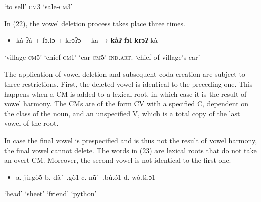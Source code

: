\begin{styleindexi}
          ‘to sell’                    \textsc{cm}3                                            ‘sale-\textsc{cm3}’
\end{styleindexi}

In (22), the vowel deletion process takes place three times.      

\begin{itemize}
\item \begin{styleindexi}
  \label{bkm:Ref499224954}kà-ʔà             +     fɔ.lɔ            +   krɔʔɔ         +     ka         →      \textbf{kàʔ}{}-\textbf{fɔl}{}-\textbf{krɔʔ}{}-kà
\end{styleindexi}\end{itemize}
\begin{styleindexi}
          ‘village-\textsc{cm}5’          ‘chief-\textsc{cm1}’      ‘car-\textsc{cm}5’       \textsc{ind.art}.          ‘chief of village’s car’
\end{styleindexi}

The application of vowel deletion and subsequent coda creation are subject to three restrictions. First, the deleted vowel is identical to the preceding one. This happens when a CM is added to a lexical root, in which case it is the result of vowel harmony. The CMs are of the form CV with a specified C, dependent on the class of the noun, and an unspecified V, which is a total copy of the last vowel of the root. 

In case the final vowel is prespecified and is thus not the result of vowel harmony, the final vowel cannot delete. %
The words in (23) are lexical roots that do not take an overt CM. Moreover, the second vowel is not identical to the first one.

\begin{itemize}
\item \begin{styleindexi}
  \label{bkm:Ref501027015}a. jù.gò5             b.  dã\`{} .gò1             c.  nũ\`{} .bú.ó1                    d.  wó.tì.ɔ1  
\end{styleindexi}\end{itemize}
\begin{styleindexi}
            ‘head’                   ‘sheet’                 ‘friend’                        ‘python’
\end{styleindexi}

